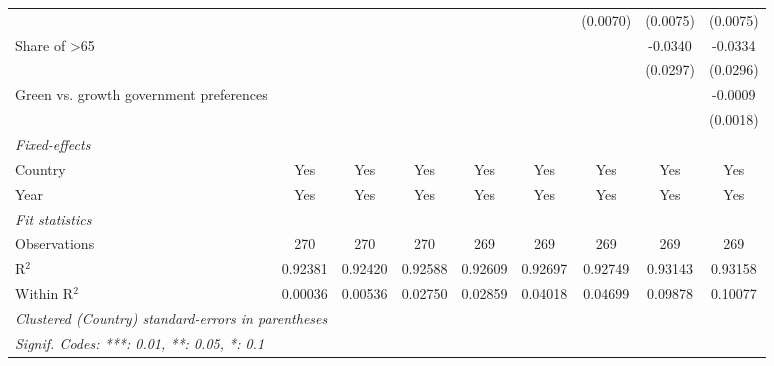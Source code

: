 \begin{table}[htbp]
\begin{tabular}{lcccccccc}
                                                               &          &          &          &          &          & (0.0070) & (0.0075) & (0.0075)\\   
      Share of >65                                             &          &          &          &          &          &          & -0.0340  & -0.0334\\   
                                                               &          &          &          &          &          &          & (0.0297) & (0.0296)\\   
      Green vs. growth government preferences                  &          &          &          &          &          &          &          & -0.0009\\   
                                                               &          &          &          &          &          &          &          & (0.0018)\\   
      \midrule
      \emph{Fixed-effects}\\
      Country                                                  & Yes      & Yes      & Yes      & Yes      & Yes      & Yes      & Yes      & Yes\\  
      Year                                                     & Yes      & Yes      & Yes      & Yes      & Yes      & Yes      & Yes      & Yes\\  
      \midrule
      \emph{Fit statistics}\\
      Observations                                             & 270      & 270      & 270      & 269      & 269      & 269      & 269      & 269\\  
      R$^2$                                                    & 0.92381  & 0.92420  & 0.92588  & 0.92609  & 0.92697  & 0.92749  & 0.93143  & 0.93158\\  
      Within R$^2$                                             & 0.00036  & 0.00536  & 0.02750  & 0.02859  & 0.04018  & 0.04699  & 0.09878  & 0.10077\\  
      \midrule \midrule
      \multicolumn{9}{l}{\emph{Clustered (Country) standard-errors in parentheses}}\\
      \multicolumn{9}{l}{\emph{Signif. Codes: ***: 0.01, **: 0.05, *: 0.1}}\\
   \end{tabular}
\end{table}


